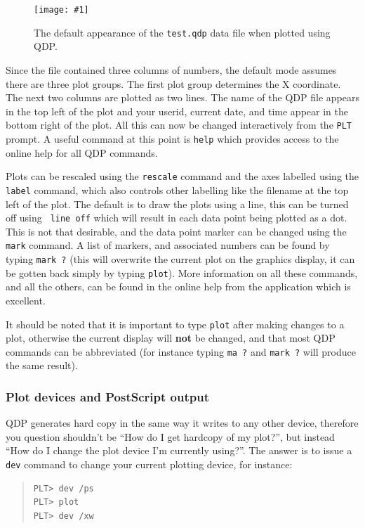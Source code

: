 \documentclass[twoside,11pt]{article}
\newcommand{\htmladdimg}[1]{}
\newcommand{\myfig}[5]{
  \begin{figure}
    \centering\texttt{[image: \#1]}
    \typeout{#1 inserted on page \arabic{page}}
    \caption{\label{#4}#5}
  \end{figure}
  }
\newcommand{\myfig}[5]{
    \label{#4} \htmladdimg{#3}\\
    Figure: #5\\
  }
\begin{document}
\myfig{sc15_qdp_plot_1.eps}{height=0.3\textheight}{sc15_qdp_plot_1.gif}{sc15_qdp_plot_1}{The
default appearance of the {\tt test.qdp} data file when plotted using
QDP.} 

Since the file contained three columns of numbers, the default mode
assumes there are three plot groups. The first plot group determines
the X coordinate. The next two columns are plotted as two lines. The
name of the QDP file appears in the top left of the plot and your
userid, current date, and time appear in the bottom right of the plot.
All this can now be changed interactively from the {\tt PLT} prompt. A
useful command at this point is {\tt help} which provides access to
the online help for all QDP commands.

Plots can be rescaled using the {\tt rescale} command and the axes
labelled using the {\tt label} command, which also controls other
labelling like the filename at the top left of the plot. The default
is to draw the plots using a line, this can be turned off using {\tt
line off} which will result in each data point being plotted as a dot.
This is not that desirable, and the data point marker can be changed
using the {\tt mark} command. A list of markers, and associated
numbers can be found by typing {\tt mark ?} (this will overwrite the
current plot on the graphics display, it can be gotten back simply by
typing {\tt plot}). More information on all these commands, and all
the others, can be found in the online help from the application which
is excellent.

It should be noted that it is important to type {\tt plot} after
making changes to a plot, otherwise the current display will {\bf not}
be changed, and that most QDP commands can be abbreviated (for
instance typing {\tt ma ?} and {\tt mark ?} will produce the same
result).

\subsubsection{Plot devices and PostScript output}

QDP generates hard copy in the same way it writes to any other device,
therefore you question shouldn't be ``How do I get hardcopy of my
plot?'', but instead ``How do I change the plot device I'm currently
using?''. The answer is to issue a {\tt dev} command to change your
current plotting device, for instance:

\small
\begin{quote}
\begin{verbatim}
PLT> dev /ps
PLT> plot
PLT> dev /xw
\end{verbatim}
\end{quote}
\normalsize
\end{document}

